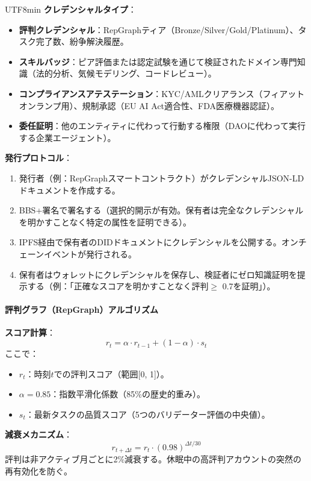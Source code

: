 \documentclass[11pt]{article}
\begin{document}
\begin{CJK}{UTF8}{min}
\textbf{クレデンシャルタイプ}：
\begin{itemize}[noitemsep]
  \item \textbf{評判クレデンシャル}：RepGraphティア（Bronze/Silver/Gold/Platinum）、タスク完了数、紛争解決履歴。
  \item \textbf{スキルバッジ}：ピア評価または認定試験を通じて検証されたドメイン専門知識（法的分析、気候モデリング、コードレビュー）。
  \item \textbf{コンプライアンスアテステーション}：KYC/AMLクリアランス（フィアットオンランプ用）、規制承認（EU AI Act適合性、FDA医療機器認証）。
  \item \textbf{委任証明}：他のエンティティに代わって行動する権限（DAOに代わって実行する企業エージェント）。
\end{itemize}

\textbf{発行プロトコル}：
\begin{enumerate}[noitemsep]
  \item 発行者（例：RepGraphスマートコントラクト）がクレデンシャルJSON-LDドキュメントを作成する。
  \item BBS+署名で署名する（選択的開示が有効。保有者は完全なクレデンシャルを明かすことなく特定の属性を証明できる）。
  \item IPFS経由で保有者のDIDドキュメントにクレデンシャルを公開する。オンチェーンイベントが発行される。
  \item 保有者はウォレットにクレデンシャルを保存し、検証者にゼロ知識証明を提示する（例：「正確なスコアを明かすことなく評判$\geq$ 0.7を証明」）。
\end{enumerate}

\paragraph{評判グラフ（RepGraph）アルゴリズム}

\textbf{スコア計算}：
\begin{equation}
r_t = \alpha \cdot r_{t-1} + (1 - \alpha) \cdot s_t
\end{equation}
ここで：
\begin{itemize}[noitemsep]
  \item $r_t$：時刻$t$での評判スコア（範囲[0, 1]）。
  \item $\alpha = 0.85$：指数平滑化係数（85\%の歴史的重み）。
  \item $s_t$：最新タスクの品質スコア（5つのバリデーター評価の中央値）。
\end{itemize}

\textbf{減衰メカニズム}：
\begin{equation}
r_{t+\Delta t} = r_t \cdot (0.98)^{\Delta t / 30}
\end{equation}
評判は非アクティブ月ごとに2\%減衰する。休眠中の高評判アカウントの突然の再有効化を防ぐ。


\end{CJK}
\end{document}
